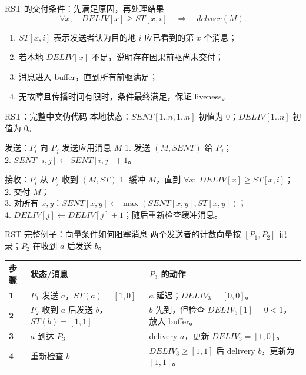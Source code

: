 \documentclass[UTF8,fontset=none,aspectratio=169,10pt]{beamer}
\begin{document}
{\begin{frame}{RST 的交付条件：先满足原因，再处理结果}
\[
\forall x,\quad DELIV[x]\ge ST[x,i]
\quad\Longrightarrow\quad deliver(M).
\]
\begin{enumerate}
  \item $ST[x,i]$ 表示发送者认为目的地 $i$ 应已看到的第 $x$ 个消息；
  \item 若本地 $DELIV[x]$ 不足，说明存在因果前驱尚未交付；
  \item 消息进入 buffer，直到所有前驱满足；
  \item 无故障且传播时间有限时，条件最终满足，保证 liveness。
\end{enumerate}
\end{frame}

\begin{frame}{RST：完整中文伪代码}
\scriptsize
本地状态：$SENT[1..n,1..n]$ 初值为 0；$DELIV[1..n]$ 初值为 0。
\begin{block}{发送：$P_i$ 向 $P_j$ 发送应用消息 $M$}
1. 发送 $(M,SENT)$ 给 $P_j$；\\
2. $SENT[i,j]\leftarrow SENT[i,j]+1$。
\end{block}
\begin{block}{接收：$P_i$ 从 $P_j$ 收到 $(M,ST)$}
1. 缓冲 $M$，直到 $\forall x:\ DELIV[x]\ge ST[x,i]$；\\
2. 交付 $M$；\\
3. 对所有 $x,y$：$SENT[x,y]\leftarrow\max(SENT[x,y],ST[x,y])$；\\
4. $DELIV[j]\leftarrow DELIV[j]+1$；随后重新检查缓冲消息。
\end{block}
\normalsize
{}
\end{frame}

\begin{frame}{RST 完整例子：向量条件如何阻塞消息}
\small
两个发送者的计数向量按 $[P_1,P_2]$ 记录；$P_2$ 在收到 $a$ 后发送 $b$。
\begin{center}
\begin{tabularx}{.96\linewidth}{>{\bfseries}p{1.3cm}>{\raggedright\arraybackslash}p{3.5cm}>{\raggedright\arraybackslash}X}
\toprule
步骤 & 状态/消息 & $P_3$ 的动作 \\
\midrule
1 & $P_1$ 发送 $a$，$ST(a)=[1,0]$ & $a$ 延迟；$DELIV_3=[0,0]$。 \\
2 & $P_2$ 收到 $a$ 后发送 $b$，$ST(b)=[1,1]$ & $b$ 先到，但检查 $DELIV_3[1]=0<1$，放入 buffer。 \\
3 & $a$ 到达 $P_3$ & delivery $a$，更新 $DELIV_3=[1,0]$。 \\
4 & 重新检查 $b$ & $DELIV_3\ge[1,1]$ 后 delivery $b$，更新为 $[1,1]$。 \\
\bottomrule
\end{tabularx}
\end{center}
\end{frame}

}
\end{document}
